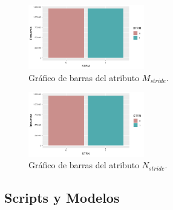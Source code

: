 \documentclass[osajnl,twocolumn,showpacs,superscriptaddress,10pt]{revtex4-1} %
\begin{document}
\begin{figure}[H]
    \centering
    \includegraphics[width=0.45\textwidth]{plots/strm_bar}
    \caption{Gráfico de barras del atributo $M_{stride}$.}
    \label{figure:strm_bar}
\end{figure}

\begin{figure}[H]
    \centering
    \includegraphics[width=0.45\textwidth]{plots/strn_bar}
    \caption{Gráfico de barras del atributo $N_{stride}$.}
    \label{figure:strn_bar}
\end{figure}

\onecolumngrid

\subsection{Scripts y Modelos} \label{apendix:scripts}
\end{document}
